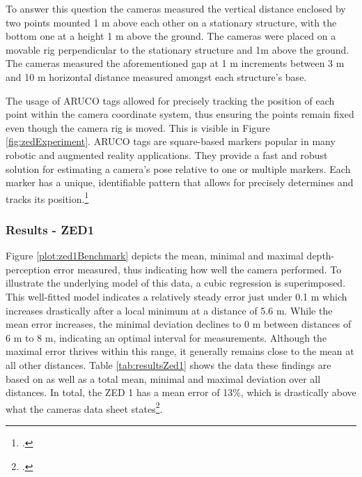 To answer this question the cameras measured the vertical distance enclosed by two points mounted 1 m above each other on a stationary structure, with the bottom one at a height 1 m above the ground. 
The cameras were placed on a movable rig perpendicular to the stationary structure and 1m above the ground. The cameras measured the aforementioned gap at 1 m increments between 3 m and 10 m horizontal distance measured amongst each structure's base. 

The usage of ARUCO tags allowed for precisely tracking the position of each point within the camera coordinate system, thus ensuring the points remain fixed even though the camera rig is moved. This is visible in Figure \ref{fig:zedExperiment}.
ARUCO tags are square-based markers popular in many robotic and augmented reality applications. They provide a fast and robust solution for estimating a camera's pose relative to one or multiple markers. Each marker has a unique, identifiable pattern that allows for precisely determines and tracks its position.\footcite{jurado2015} 

\subsubsection{Results - ZED1}

Figure \ref{plot:zed1Benchmark} depicts the mean, minimal and maximal depth-perception error measured, thus indicating how well the camera performed.
To illustrate the underlying model of this data, a cubic regression is superimposed. This well-fitted model indicates a relatively steady error just under 0.1 m which increases drastically after a local minimum at a distance of 5.6 m. 
While the mean error increases, the minimal deviation declines to 0 m between distances of 6 m to 8 m, indicating an optimal interval for measurements. Although the maximal error thrives within this range, it generally remains close to the mean at all other distances.
Table \ref{tab:resultsZed1} shows the data these findings are based on as well as a total mean, minimal and maximal deviation over all distances. 
In total, the ZED 1 has a mean error of 13\%, which is drastically above what the cameras data sheet states\footcite{zed1Datasheet}.

%
%


